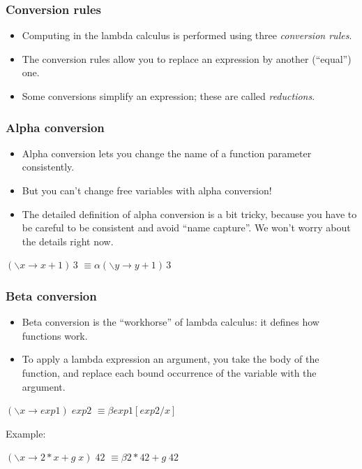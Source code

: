 \documentclass{beamer}
\newcommand{\alphaconv}{\hbox{\quad$\equiv\alpha$\quad}}
\newcommand{\betaconv}{\hbox{\quad$\equiv\beta$\quad}}
\begin{document}
\begin{frame}[fragile]
\frametitle{Conversion rules}

\begin{itemize}
\item Computing in the lambda calculus is performed using three
  \emph{conversion rules}.
\item The conversion rules allow you to replace an expression by
  another (``equal'') one.
\item Some conversions simplify an expression; these are called
  \emph{reductions}.
\end{itemize}

\end{frame}

\begin{frame}[fragile]
\frametitle{Alpha conversion}

\begin{itemize}
\item Alpha conversion lets you change the name of a function
  parameter consistently.
\item But you can't change free variables with alpha conversion!
\item The detailed definition of alpha conversion is a bit tricky,
  because you have to be careful to be consistent and avoid ``name
  capture''.  We won't worry about the details right now.
\end{itemize}

$(\backslash x \rightarrow x+1) \,3$ \alphaconv $(\backslash y \rightarrow y+1) \,3$

\end{frame}

\begin{frame}[fragile]
\frametitle{Beta conversion}

\begin{itemize}
\item Beta conversion is the ``workhorse'' of lambda calculus: it
  defines how functions work.
\item To apply a lambda expression an argument, you take the body
  of the function, and replace each bound occurrence of the
  variable with the argument.
\end{itemize}

$(\backslash x \rightarrow exp1) \;exp2$ \betaconv $exp1[exp2/x]$

\vspace{2em}
Example:
\vspace{0.5em}

$(\backslash x \rightarrow 2*x + g\; x) \;42$ \betaconv $2*42 + g \;42$

\end{frame}
\end{document}
